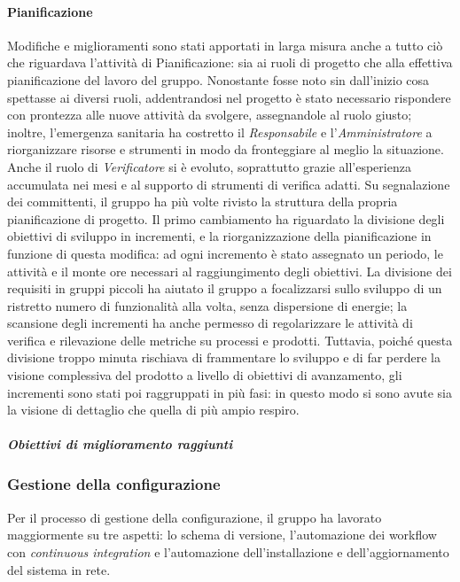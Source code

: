 			\paragraph{Pianificazione}
				Modifiche e miglioramenti sono stati apportati in larga misura anche a tutto ciò che riguardava l'attività di Pianificazione: sia ai ruoli di progetto che alla effettiva pianificazione del lavoro del gruppo.
				\newline
				Nonostante fosse noto sin dall'inizio cosa spettasse ai diversi ruoli, addentrandosi nel progetto è stato necessario rispondere con prontezza alle nuove attività da svolgere, assegnandole al ruolo giusto; inoltre, l'emergenza sanitaria ha costretto il \textit{Responsabile} e l'\textit{Amministratore} a riorganizzare risorse e strumenti in modo da fronteggiare al meglio la situazione. Anche il ruolo di \textit{Verificatore} si è evoluto, soprattutto grazie all'esperienza accumulata nei mesi e al supporto di strumenti di verifica adatti.
				\newline
				Su segnalazione dei committenti, il gruppo ha più volte rivisto la struttura della propria pianificazione di progetto. Il primo cambiamento ha riguardato la divisione degli obiettivi di sviluppo in incrementi, e la riorganizzazione della pianificazione in funzione di questa modifica: ad ogni incremento è stato assegnato un periodo, le attività e il monte ore necessari al raggiungimento degli obiettivi. La divisione dei requisiti in gruppi piccoli ha aiutato il gruppo a focalizzarsi sullo sviluppo di un ristretto numero di funzionalità alla volta, senza dispersione di energie; la scansione degli incrementi ha anche permesso di regolarizzare le attività di verifica e rilevazione delle metriche su processi e prodotti. Tuttavia, poiché questa divisione troppo minuta rischiava di frammentare lo sviluppo e di far perdere la visione complessiva del prodotto a livello di obiettivi di avanzamento, gli incrementi sono stati poi raggruppati in più fasi: in questo modo si sono avute sia la visione di dettaglio che quella di più ampio respiro.
				
				\subparagraph{Obiettivi di miglioramento raggiunti}
		
		\subsubsection{Gestione della configurazione}
			Per il processo di gestione della configurazione, il gruppo ha lavorato maggiormente su tre aspetti: lo schema di versione, l'automazione dei workflow con \textit{continuous integration} e l'automazione dell'installazione e dell'aggiornamento del sistema in rete.
			

